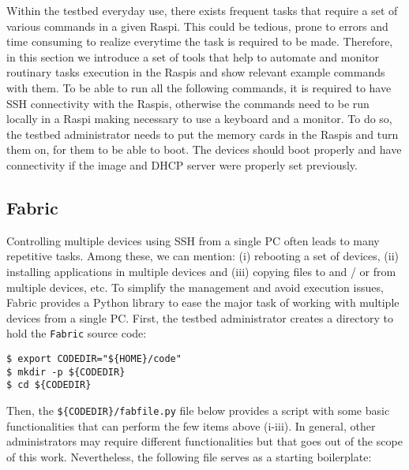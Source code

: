 
\label{sec:tools}
Within the testbed everyday use, there exists frequent tasks that require
a set of various commands in a given \ac{Raspi}. This could be tedious, prone
to errors and time consuming to realize everytime the task is required to be
made. Therefore, in this section we introduce a set of tools that help to
automate and monitor routinary tasks execution in the \ac{Raspi}s and show
relevant example commands with them. To be able to run all the following
commands, it is required to have \ac{SSH} connectivity with the \ac{Raspi}s,
otherwise the commands need to be run locally in a \ac{Raspi} making
necessary to use a keyboard and a monitor. To do so, the testbed
administrator needs to put the memory cards in the \ac{Raspi}s and turn them
on, for them to be able to boot. The devices should boot properly and have
connectivity if the image and \ac{DHCP} server were properly set previously.


\subsection{Fabric}
Controlling multiple devices using \ac{SSH} from a single \ac{PC}
often leads to many repetitive tasks. Among these, we can mention:
(i) rebooting a set of devices, (ii) installing applications in multiple
devices and (iii) copying files to and / or from multiple devices, etc. To
simplify the management and avoid execution issues, Fabric provides
a Python library to ease the major task of working with multiple devices from
a single \ac{PC}. First, the testbed administrator creates a directory to
hold the \texttt{Fabric} source code:

\begin{lstlisting}[]
$ export CODEDIR="${HOME}/code"
$ mkdir -p ${CODEDIR}
$ cd ${CODEDIR}
\end{lstlisting}
\FloatBarrier
\vspace{-5mm}

Then, the \texttt{\$\{CODEDIR\}/fabfile.py} file below provides a script with
some basic functionalities that can perform the few items above (i-iii).
In general, other administrators may require different functionalities
but that goes out of the scope of this work. Nevertheless, the following
file serves as a starting boilerplate:

